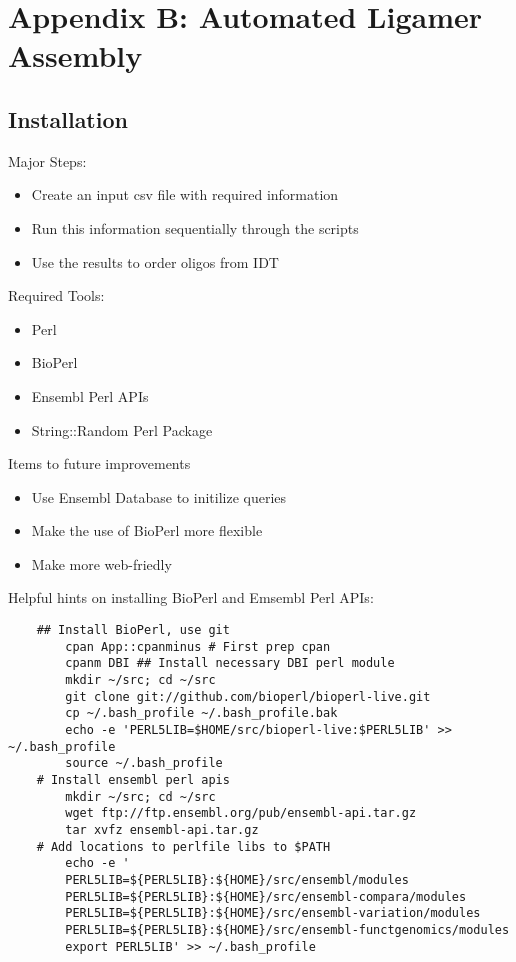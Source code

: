 \chapter{Appendix B: Automated Ligamer Assembly}\label{Appendix:AutoMatedLigamerAssembly} 

\section{Installation}

Major Steps:
\begin{itemize}
	\item  Create an input csv file with required information
	\item  Run this information sequentially through the scripts
	\item  Use the results to order oligos from IDT
\end{itemize}

Required Tools:
\begin{itemize}
	\item  Perl
	\item  BioPerl
	\item  Ensembl Perl APIs
	\item  String::Random Perl Package
\end{itemize}

Items to future improvements
\begin{itemize}
	\item Use Ensembl Database to initilize queries
	\item Make the use of BioPerl more flexible
	\item Make more web-friedly
\end{itemize}

Helpful hints on installing BioPerl and Emsembl Perl APIs:

\lstset{language=BASH}
\begin{lstlisting}
	## Install BioPerl, use git
	    cpan App::cpanminus # First prep cpan
	    cpanm DBI ## Install necessary DBI perl module
	    mkdir ~/src; cd ~/src
	    git clone git://github.com/bioperl/bioperl-live.git
	    cp ~/.bash_profile ~/.bash_profile.bak
	    echo -e 'PERL5LIB=$HOME/src/bioperl-live:$PERL5LIB' >> ~/.bash_profile
	    source ~/.bash_profile
	# Install ensembl perl apis
	    mkdir ~/src; cd ~/src
	    wget ftp://ftp.ensembl.org/pub/ensembl-api.tar.gz
	    tar xvfz ensembl-api.tar.gz
	# Add locations to perlfile libs to $PATH
	    echo -e '
	    PERL5LIB=${PERL5LIB}:${HOME}/src/ensembl/modules
	    PERL5LIB=${PERL5LIB}:${HOME}/src/ensembl-compara/modules
	    PERL5LIB=${PERL5LIB}:${HOME}/src/ensembl-variation/modules
	    PERL5LIB=${PERL5LIB}:${HOME}/src/ensembl-functgenomics/modules
	    export PERL5LIB' >> ~/.bash_profile
\end{lstlisting}
